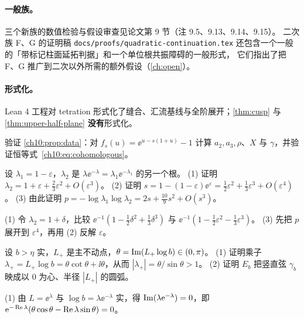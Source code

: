 \paragraph{一般族。}三个新族的数值检验与假设审查见论文第 9 节（注 9.5、9.13、9.14、9.15）。
二次族 F、G 的证明稿 \texttt{docs/proofs/quadratic-continuation.tex} 还包含一个一般的「带标记柱面延拓判据」和一个单位根共振障碍的一般形式，
它们指出了把 F、G 推广到二次以外所需的额外假设（\cref{ch:open}）。

\paragraph{形式化。}Lean 4 工程对 tetration 形式化了缝合、汇流基线与全阶展开；\cref{thm:cusp} 与 \cref{thm:upper-half-plane} \textbf{没有}形式化。

\exercises

\begin{exercise}\label{ch10:ex:data}
验证 \cref{ch10:prop:data}：对 $f_s(u)=\ee^{u-s(1+u)}-1$ 计算 $a_2,a_3,\rho$、$X$ 与 $\gamma$，并验证恒等式~\eqref{ch10:eq:cohomologous}。
\end{exercise}

\begin{exercise}\label{ch10:ex:p}
设 $\lambda_1=1-\varepsilon$，$\lambda_2$ 是 $\lambda\ee^{-\lambda}=\lambda_1\ee^{-\lambda_1}$ 的另一个根。
(1) 证明 $\lambda_2=1+\varepsilon+\tfrac23\varepsilon^2+O(\varepsilon^3)$。
(2) 证明 $s=1-(1-\varepsilon)\ee^{\varepsilon}=\tfrac12\varepsilon^2+\tfrac13\varepsilon^3+O(\varepsilon^4)$。
(3) 由此证明 $p=-\log\lambda_1\log\lambda_2=2s+\tfrac{10}9s^2+O(s^3)$。
\end{exercise}
\begin{hint}
(1) 令 $\lambda_2=1+\delta$，比较 $\ee^{-1}(1-\tfrac12\delta^2+\tfrac13\delta^3)$ 与 $\ee^{-1}(1-\tfrac12\varepsilon^2-\tfrac13\varepsilon^3)$。
(3) 先把 $p$ 展开到 $\varepsilon^4$，再用 (2) 反解 $\varepsilon$。
\end{hint}

\begin{exercise}\label{ch10:ex:exterior}
设 $b>\eta$ 实，$L_+$ 是主不动点，$\theta=\operatorname{Im}(L_+\log b)\in(0,\pi)$。
(1) 证明乘子 $\lambda_+=L_+\log b=\theta\cot\theta+\ii\theta$，从而 $|\lambda_+|=\theta/\sin\theta>1$。
(2) 证明 $E_b$ 把竖直弦 $\gamma_b$ 映成以 $0$ 为心、半径 $|L_+|$ 的圆弧。
\end{exercise}
\begin{hint}
(1) 由 $L=\ee^\lambda$ 与 $\log b=\lambda\ee^{-\lambda}$ 实，得 $\operatorname{Im}(\lambda\mathrm{e}^{-\lambda})=0$，即 $\mathrm{e}^{-\operatorname{Re}\lambda}(\theta\cos\theta-\operatorname{Re}\lambda\sin\theta)=0$。
\end{hint}

